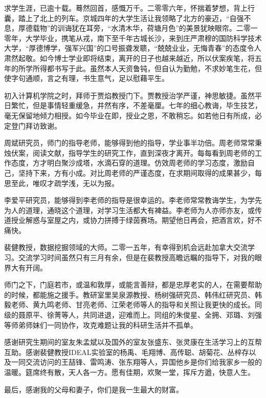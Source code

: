 

\begin{ack}
求学生涯，已逾十载。蓦然回首，感慨万千。二零零六年，怀揣着梦想，背上行囊，踏上了北上的列车。京城四年的大学生活让我领略了北方的豪迈，“自强不息，厚德载物”的训诲犹在耳旁，“水清木华，荷塘月色”的美景犹映眼帘。二零一零年，大学毕业，携笔从戎，南下至千年古城长沙，来到庄严肃穆的国防科学技术大学，“厚德博学，强军兴国”的口号振聋发聩，“兢兢业业，无悔青春”的态度令人肃然起敬。如今博士学业即将结束，离开的日子也越来越近，所以伏案疾笔，将五年的所学所得都书写于此。虽然本人天资鲁钝，但自认为勤勉，不求妙笔生花，但使字句通顺，言之有理，书生意气，足以慰藉平生。

初入计算机学院之时，拜师于贾焰教授门下。贾教授治学严谨，神思敏捷。虽然平日繁忙，但是事情轻重缓急，井然有序，不差毫厘。七年的细心教诲，毕生技艺，毫无保留地倾力相授。如今毕业在即，授业之恩，不敢稍忘。如若他日有所成，必定登门拜访致谢。

周斌研究员，师门的指导老师，能够得到他的指导，学业事半功倍。周老师常常秉烛伏案，阅读文献，指导学生的研究工作，直到深夜才离开。每每看到周老师的工作态度，方才明白聚沙成塔，水滴石穿的道理。仿效周老师的学习态度，激励自己，坚持下来，方有小成。对比周老师的严谨态度，在求期间取得的成果甚少，每思至此，唯叹才疏学浅，无以为报。

李爱平研究员，能够得到李老师的指导是很幸运的。李老师常常教诲学生，为学先为人的道理，通晓这个道理，对学习生活都大有裨益。李老师为人亦师亦友，或传道授业解惑与室屋之内，或协力拼搏于绿茵赛场。期望他日再会，把酒言欢，好不痛快。

裴健教授，数据挖掘领域的大师。二零一五年，有幸得到机会远赴加拿大交流学习。交流学习时间虽然只有三月有余，但是在裴教授高瞻远瞩的指导下，对我的眼界大有开阔。

师门之下，门庭若市，或温和敦厚，或能言善辩，都是忠厚老实的人，在需要帮助的时候，都能施之援手。教研室里吴泉源教授、杨树强研究员、韩伟红研究员、韩毅老师、黄九鸣老师、甘亮老师、江荣老师等人的指导和关照让我更快的成长。同级的聂原平、徐菁等人，共同进退，迎难而上。同组的朱俊星、全拥、邓璐、刘强等师弟师妹们一同协作，攻克难题让我的科研生活并不孤单。

感谢研究生期间的室友朱孟斌以及国外的室友张盛东、张灵康在生活学习上的互帮互助。感谢裴健教授IDEAL实验室的杨禹、毛翔博、高传聪、胡菊花、丛梓存以及一同交流访问的王喆锋、雷鸣涛、张东翔等人，异国他乡是你们给我家乡一般的温暖。筵席终有散，天人各一方。愿有佳期，欢聚一堂，挥斥方遒，快意人生。

最后，感谢我的父母和妻子，你们是我一生最大的财富。
\end{ack}
